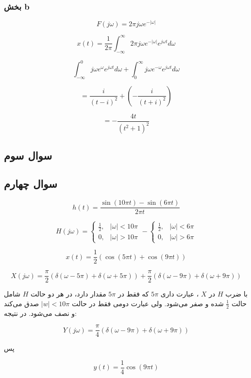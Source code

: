 \documentclass[12pt]{article}
\begin{document}
\subsubsection{بخش b}

$$F(j\omega) = 2\pi j \omega e^{-|\omega|}$$


$$x(t) =\frac{1}{2\pi}\int_{-\infty}^{\infty} 2\pi j \omega e^{-|\omega|} e^{j \omega t} d \omega$$

$$ \int_{-\infty}^{0} j\omega e^{\omega} e^{j \omega t} d\omega + \int_{0}^{\infty} j\omega e^{-\omega} e^{j\omega t} d\omega$$

$$=\frac{i}{(t-i)^2} +(-\frac{i}{(t+i)^2}) $$

$$=-\frac{4 t}{\left(t^2+1\right)^2}$$

\newpage
\subsection{سوال سوم}
\newpage

\subsection{سوال چهارم}

$$h(t)=\frac{\sin (10 \pi  t)-\sin (6 \pi  t)}{2 \pi  t}$$

$$H(j\omega) = 
\left\{\begin{array}{ll}
	\frac{1}{2}, & |\omega|<10\pi \\
	0, & |\omega|>10\pi
\end{array}\right.
 -
 \left\{\begin{array}{ll}
 	\frac{1}{2}, & |\omega|<6\pi \\
 	0, & |\omega|>6\pi
 \end{array}\right.
 $$
 
 
 $$x(t) = \frac{1}{2} (\cos (5 \pi  t)+\cos (9 \pi  t))$$
 
 
 $$X(j\omega) = \frac{\pi}{2} (\delta(\omega-5\pi) + \delta(\omega + 5\pi)) + \frac{\pi}{2} (\delta(\omega-9\pi) + \delta(\omega + 9\pi))$$
 
 با ضرب $H$ در $X$ ، عبارت داری $5\pi$ که فقط در $5\pi$ مقدار دارد، در هر دو حالت $H$ شامل حالت $\frac{1}{2}$ شده و صفر می‌شود. ولی عبارت دومی فقط در حالت $|w|<10\pi$ صدق می‌کند و نصف می‌شود. در نتیجه:
 
 $$Y(j\omega) =\frac{\pi}{4} (\delta(\omega-9\pi) + \delta(\omega + 9\pi))$$
 
 پس
 
 $$y(t) = \frac{1}{4} \cos (9 \pi t)$$
 
\end{document}
